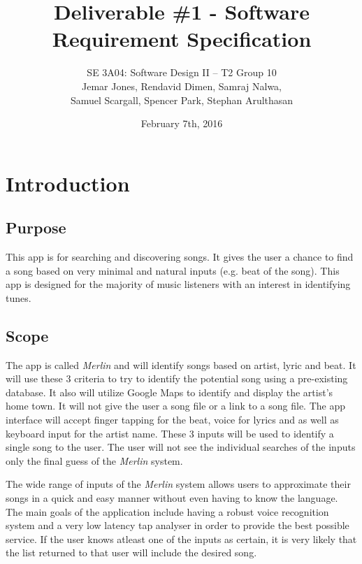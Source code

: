 \documentclass[]{article}
\newcommand{\merlin}{\textit{Merlin }}
\begin{document}
\begin{titlepage}
\title{Deliverable \#1 - Software Requirement Specification}
\author{
	SE 3A04: Software Design II -- T2 Group 10\\
  	Jemar Jones, Rendavid Dimen, Samraj Nalwa, \\
  	Samuel Scargall, Spencer Park, Stephan Arulthasan
}
\date{February 7th, 2016}
\maketitle
\end{titlepage}

\newpage

\tableofcontents
\listoftables
\listoffigures

\section{Introduction}
\label{sec:introduction}

\subsection{Purpose}
\label{sub:purpose}
	This app is for searching and discovering songs. It gives the user a chance to find a song based on very minimal and natural inputs (e.g. beat of the song). This app is designed for the majority of music listeners with an interest in identifying tunes.

\subsection{Scope}
\label{sub:scope}
\cbstart
The app is called \merlin and will identify songs based on artist, lyric and beat. It will use these 3 criteria to try to identify the potential song using a pre-existing database. It also will utilize Google Maps to identify and display the artist’s home town. It will not give the user a song file or a link to a song file. The app interface will accept finger tapping for the beat, voice for lyrics and as well as keyboard input for the artist name. These 3 inputs will be used to identify a single song to the user. The user will not see the individual searches of the inputs only the final guess of the \merlin system.

The wide range of inputs of the \merlin system allows users to approximate their songs in a quick and easy manner without even having to know the language. The main goals of the application include having a robust voice recognition system and a very low latency tap analyser in order to provide the best possible service. If the user knows atleast one of the inputs as certain, it is very likely that the list returned to that user will include the desired song. 
\cbend
\end{document}
